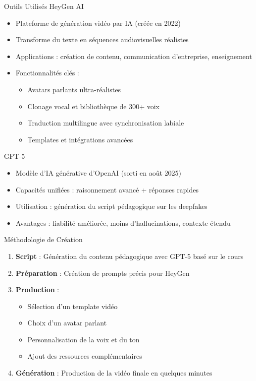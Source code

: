 \documentclass[12pt, a4em]{article}
\begin{document}
	Outils Utilisés
	HeyGen AI
	\begin{itemize}
		\item Plateforme de génération vidéo par IA (créée en 2022)
		\item Transforme du texte en séquences audiovisuelles réalistes
		\item Applications : création de contenu, communication d'entreprise, enseignement
		\item Fonctionnalités clés :
		\begin{itemize}
			\item Avatars parlants ultra-réalistes
			\item Clonage vocal et bibliothèque de 300+ voix
			\item Traduction multilingue avec synchronisation labiale
			\item Templates et intégrations avancées
		\end{itemize}
	\end{itemize}
	
	GPT-5
	\begin{itemize}
		\item Modèle d'IA générative d'OpenAI (sorti en août 2025)
		\item Capacités unifiées : raisonnement avancé + réponses rapides
		\item Utilisation : génération du script pédagogique sur les deepfakes
		\item Avantages : fiabilité améliorée, moins d'hallucinations, contexte étendu
	\end{itemize}
	
	Méthodologie de Création
	\begin{enumerate}
		\item \textbf{Script} : Génération du contenu pédagogique avec GPT-5 basé sur le cours
		\item \textbf{Préparation} : Création de prompts précis pour HeyGen
		\item \textbf{Production} :
		\begin{itemize}
			\item Sélection d'un template vidéo
			\item Choix d'un avatar parlant
			\item Personnalisation de la voix et du ton
			\item Ajout des ressources complémentaires
		\end{itemize}
		\item \textbf{Génération} : Production de la vidéo finale en quelques minutes
	\end{enumerate}
	
\end{document}
